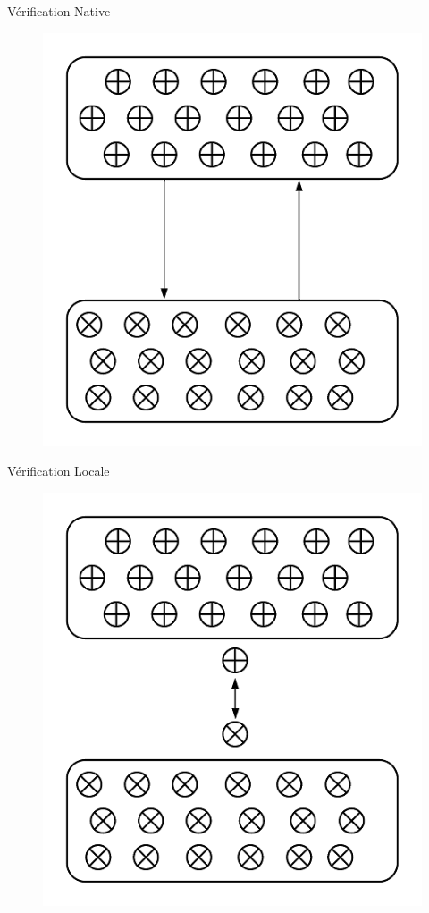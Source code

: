 \begin{frame}{Vérification Native}
    \begin{figure}
        \centering
        \includegraphics[scale = 0.5]{img/DiagrammeVerifNative.png}
    \end{figure}
\end{frame}

\begin{frame}{Vérification Locale}
    \begin{figure}
        \centering
        \includegraphics[scale = 0.5]{img/DiagrammeVerifLocale.png}
    \end{figure}
\end{frame}

